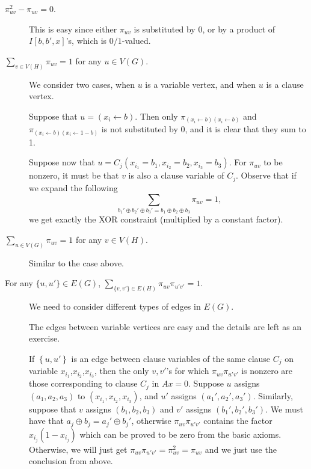 \documentclass[a4paper,twoside,justified]{tufte-handout}
\begin{document}
\begin{description}
  \item[$\pi_{uv}^2-\pi_{uv}=0$.] This is easy since either $\pi_{uv}$ is substituted by $0$, or
    by a product of $I[b,b',x]$'s, which is $0/1$-valued.
  \item[$\sum_{v \in V(H)} \pi_{uv}=1$ for any $u \in V(G)$.] We consider two cases, when $u$ is a variable vertex,
    and when $u$ is a clause vertex.

    Suppose that $u=(x_i \leftarrow b)$. Then only $\pi_{(x_i \leftarrow b)(x_i \leftarrow b)}$
    and $\pi_{(x_i \leftarrow b)(x_i \leftarrow 1-b)}$ is not substituted by $0$, and it is clear that they sum to 1.

    Suppose now that $u=C_j(x_{i_1}=b_1,x_{i_2}=b_2,x_{i_3}=b_3)$.
    For $\pi_{uv}$ to be nonzero, it must be that $v$ is also a clause variable of $C_j$.
    Observe that if we expand the following
    \[
    ~\sum_{b_1' \oplus b_2' \oplus b_3' = b_1 \oplus b_2 \oplus b_3} \pi_{uv} = 1,
    \]
    we get exactly the XOR constraint (multiplied by a constant factor).
  \item[$\sum_{u \in V(G)} \pi_{uv}=1$ for any $v \in V(H)$.] Similar to the case above.
  \item[For any $\{u,u'\} \in E(G)$, $\sum_{\{v,v'\} \in E(H)} \pi_{uv}\pi_{u'v'} = 1$.]
    We need to consider different types of edges in $E(G)$.

    The edges between variable vertices are easy and the details are left as an exercise.

    If $\left\{ u,u' \right\}$ is an edge between clause variables of the same clause 
    $C_j$ on variable $x_{i_1}$,$x_{i_2}$,$x_{i_3}$, then the only $v,v'$'s for which $\pi_{uv}\pi_{u'v'}$
    is nonzero are those corresponding to clause $C_j$ in $Ax=0$.
    Suppose $u$ assigns $(a_1,a_2,a_3)$ to $(x_{i_1},x_{i_2},x_{i_3})$, and $u'$ assigns $(a_1',a_2',a_3')$.
    Similarly, suppose that $v$ assigns $(b_1,b_2,b_3)$ and $v'$ assigns $(b_1',b_2',b_3')$.
    We must have that $a_j \oplus b_j = a_j' \oplus b_j'$, otherwise $\pi_{uv}\pi_{u'v'}$ contains
    the factor $x_{i_j}(1-x_{i_j})$ which can be proved to be zero from the basic axioms.
    Otherwise, we will just get $\pi_{uv}\pi_{u'v'}=\pi_{uv}^2=\pi_{uv}$ and we just use the conclusion from 
    above.


\end{description}
\end{document}
